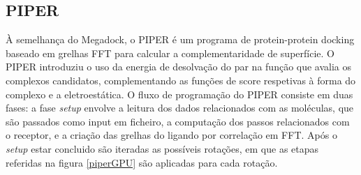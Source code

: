 
%


 \subsection{PIPER}
 À semelhança do Megadock, o PIPER é um programa de protein-protein docking baseado em grelhas FFT para calcular a complementaridade de superfície. O PIPER introduziu o uso da energia de desolvação do par na função que avalia os complexos candidatos, complementando as funções de score respetivas à forma do complexo e a eletroestática. O fluxo de programação do PIPER consiste em duas fases: a fase \textit{setup} envolve a leitura dos dados relacionados com as moléculas, que são passados como input em ficheiro, a computação dos passos relacionados com o receptor, e a criação das grelhas do ligando por correlação em FFT. Após o \textit{setup} estar concluido são iteradas as possíveis rotações, em que as etapas referidas na figura \ref{piperGPU} são aplicadas para cada rotação. 
 
